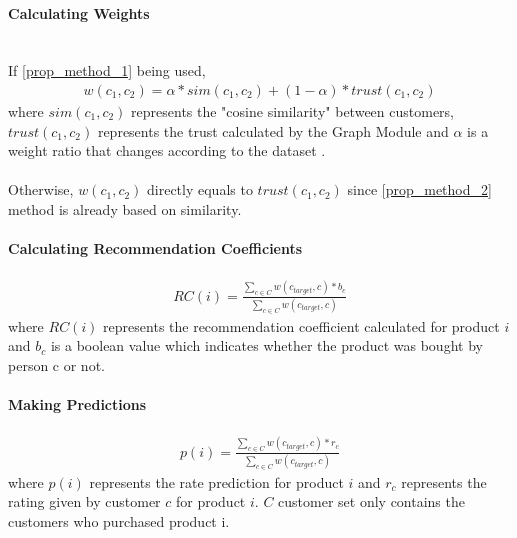 \paragraph{Calculating Weights} \mbox{}\\
If \ref{prop_method_1} being used,
\begin{equation*} 
	\begin{split}
		w(c_{1}, c_{2}) = \alpha*sim(c_{1},c_{2})+(1-\alpha)*trust(c_{1},c_{2})
	\end{split}
\end{equation*}
where $sim(c_{1},c_{2})$ represents the "cosine similarity" between customers, $trust(c_{1},c_{2})$ represents the trust calculated by the Graph Module and $\alpha$ is a weight ratio that changes according to the dataset .\\ \\
Otherwise, $w(c_{1}, c_{2})$ directly equals to $trust(c_{1},c_{2})$ since \ref{prop_method_2} method is already based on similarity.

\paragraph{Calculating Recommendation Coefficients}

\begin{equation*} 
	\begin{split}
		RC(i) = \frac{\sum_{c \in C}^{} w(c_{target}, c)*b_{c}}{\sum_{c \in C}^{} w(c_{target}, c)}
	\end{split}
\end{equation*}
where $RC(i)$ represents the recommendation coefficient calculated for product $i$ and $b_{c}$ is a boolean value which indicates whether the product was bought by person c or not.


\paragraph{Making Predictions}
\begin{equation*} 
	\begin{split}
		p(i) = \frac{\sum_{c \in C}^{} w(c_{target}, c)*r_{c}}{\sum_{c \in C}^{} w(c_{target}, c)}
	\end{split}
\end{equation*}
where $p(i)$ represents the rate prediction for product $i$ and $r_{c}$ represents the rating given by customer $c$ for product $i$. $C$ customer set only contains the customers who purchased product i.

